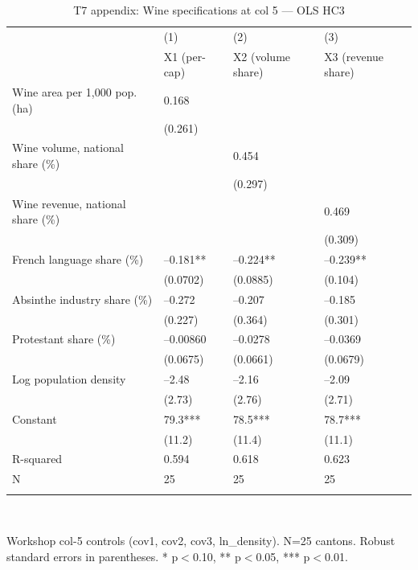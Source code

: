 \begin{table}[tbp] \centering
{}

\caption{T7 appendix: Wine specifications at col 5 --- OLS HC3}
\label{tab:T7_col5_OLS}
\begin{tabularx}{\linewidth}{@{}lCCC@{}}

\toprule
&{(1)}&{(2)}&{(3)} \tabularnewline
 & X1 (per-cap) & X2 (volume share) & X3 (revenue share) \tabularnewline 
\midrule \addlinespace[\belowrulesep]
Wine area per 1,000 pop. (ha)&0.168&& \tabularnewline
&(0.261)&& \tabularnewline
Wine volume, national share (\%)&&0.454& \tabularnewline
&&(0.297)& \tabularnewline
Wine revenue, national share (\%)&&&0.469 \tabularnewline
&&&(0.309) \tabularnewline
French language share (\%)&--0.181**&--0.224**&--0.239** \tabularnewline
&(0.0702)&(0.0885)&(0.104) \tabularnewline
Absinthe industry share (\%)&--0.272&--0.207&--0.185 \tabularnewline
&(0.227)&(0.364)&(0.301) \tabularnewline
Protestant share (\%)&--0.00860&--0.0278&--0.0369 \tabularnewline
&(0.0675)&(0.0661)&(0.0679) \tabularnewline
Log population density&--2.48&--2.16&--2.09 \tabularnewline
&(2.73)&(2.76)&(2.71) \tabularnewline
Constant&79.3***&78.5***&78.7*** \tabularnewline
&(11.2)&(11.4)&(11.1) \tabularnewline
\midrule R-squared&0.594&0.618&0.623 \tabularnewline
N&25&25&25 \tabularnewline
\bottomrule \addlinespace[\belowrulesep]

\end{tabularx}
\\ \parbox{\linewidth}{\footnotesize Workshop col-5 controls (cov1, cov2, cov3, ln\_density). N=25 cantons. Robust standard errors in parentheses. * p\(<\)0.10, ** p\(<\)0.05, *** p\(<\)0.01.}
\end{table}
